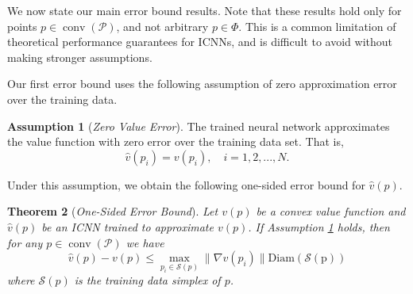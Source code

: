 \documentclass[10pt]{article} %
\theoremstyle{plain}
\newtheorem{theorem}{Theorem}[section]
\theoremstyle{definition}
\newtheorem{assumption}[theorem]{Assumption}
\theoremstyle{remark}
\begin{document}


We now state our main error bound results. Note that these results hold only for points $p \in \operatorname{conv}(\mathcal{P})$, and not arbitrary $p \in \Phi$. This is a common limitation of theoretical performance guarantees for ICNNs, and is difficult to avoid without making stronger assumptions.

Our first error bound uses the following assumption of zero approximation error over the training data.
\vspace{0.25em}
\begin{assumption}[\textit{Zero Value Error}] 
    The trained neural network approximates the value function with zero error over the training data set. That is,
    \[
    \hat{v}(p_i) = v(p_i), \quad i = 1, 2, ..., N.
    \]
    \label{ass:zero-val-error}
    \vspace{-1.5em}
\end{assumption}
Under this assumption, we obtain the following one-sided error bound for $\hat{v}(p)$. 
\vspace{0.25em}
\begin{theorem}[\textit{One-Sided Error Bound}] 
    Let $v(p)$ be a convex value function and $\hat{v}(p)$ be an ICNN trained to approximate $v(p)$. If Assumption \ref{ass:zero-val-error} holds, then for any $p \in \operatorname{conv}(\mathcal{P})$ we have
    \[
    \hat{v}(p) - v(p) \leq \max_{p_i \in \mathcal{S}(p)} \|\nabla v(p_i)\| \operatorname{Diam(\mathcal{S}(p))}
    \]
    where $\mathcal{S}(p)$ is the training data simplex of $p$.
    \label{thm:one-sided-icnn-performance}
\end{theorem}
\end{document}

